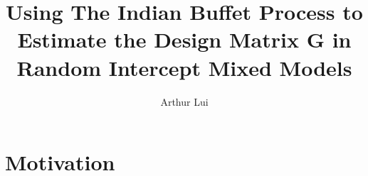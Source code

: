 \documentclass{beamer}
\title[IBP In Mixed Models]{Using The Indian Buffet Process to Estimate the Design Matrix G in
                            Random Intercept Mixed Models}
\author[Arthur Lui]{Arthur Lui}
\institute[Brigham Young University]{
  Department of Statistics\\
  Brigham Young University
}
\begin{document}
                                                          

\frame{\titlepage}
\section{Motivation}
\end{document}
